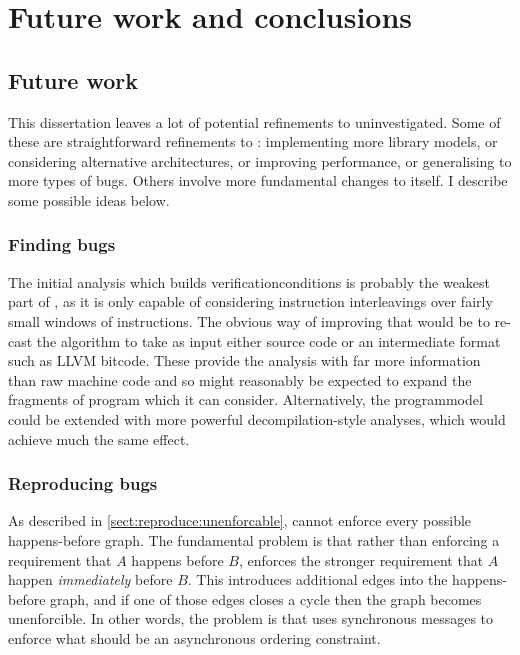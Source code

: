\chapter{Future work and conclusions}

\section{Future work}

This dissertation leaves a lot of potential refinements to
{\technique} uninvestigated.  Some of these are straightforward
refinements to {\implementation}: implementing more {\StateMachine}
library models, or considering alternative architectures, or improving
performance, or generalising to more types of bugs.  Others involve
more fundamental changes to {\technique} itself.  I describe some
possible ideas below.

\subsection{Finding bugs}

The initial analysis which builds \glspl{verificationcondition} is
probably the weakest part of {\technique}, as it is only capable of
considering instruction interleavings over fairly small windows of
instructions.  The obvious way of improving that would be to re-cast
the algorithm to take as input either source code or an intermediate
format such as LLVM bitcode\needCite{}.  These provide the analysis
with far more information than raw machine code and so might
reasonably be expected to expand the fragments of program which it can
consider.  Alternatively, the \gls{programmodel} could be extended
with more powerful decompilation-style analyses, which would achieve
much the same effect.

\subsection{Reproducing bugs}

As described in \autoref{sect:reproduce:unenforcable}, {\technique}
cannot enforce every possible happens-before graph.  The fundamental
problem is that rather than enforcing a requirement that $A$ happens
before $B$, {\technique} enforces the stronger requirement that $A$
happen \emph{immediately} before $B$.  This introduces additional edges
into the happens-before graph, and if one of those edges closes a
cycle then the graph becomes unenforcible.  In other words, the
problem is that {\technique} uses synchronous messages to enforce what
should be an asynchronous ordering constraint.

